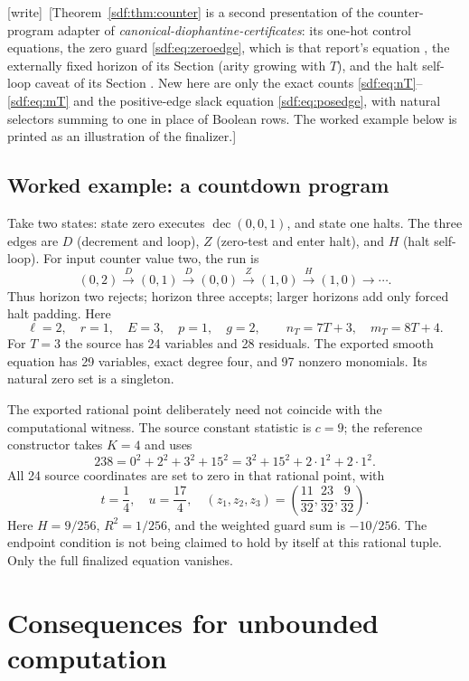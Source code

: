 \documentclass[11pt,a4paper]{article}
\theoremstyle{definition}
\theoremstyle{remark}
\newcommand{\wtag}{\textup{[write]}}
\begin{document}
\wtag\ [Theorem~\ref{sdf:thm:counter} is a second presentation of the
counter-program adapter of \emph{canonical-diophantine-certificates}: its
one-hot control equations, the zero guard \eqref{sdf:eq:zeroedge}, which is
that report's equation , the externally fixed
horizon of its Section  (arity growing with
$T$), and the halt self-loop caveat of its Section
. New here are only the exact counts
\eqref{sdf:eq:nT}--\eqref{sdf:eq:mT} and the positive-edge slack equation
\eqref{sdf:eq:posedge}, with natural selectors summing to one in place of
Boolean rows. The worked example below is printed as an illustration of the
finalizer.]

\subsection{Worked example: a countdown program}

Take two states: state zero executes
$\operatorname{dec}(0,0,1)$, and state one halts. The three edges are
$D$ (decrement and loop), $Z$ (zero-test and enter halt), and $H$ (halt
self-loop). For input counter value two, the run is
\[
 (0,2)\xrightarrow{D}(0,1)\xrightarrow{D}(0,0)
       \xrightarrow{Z}(1,0)\xrightarrow{H}(1,0)\longrightarrow\cdots.
\]
Thus horizon two rejects; horizon three accepts; larger horizons add only
forced halt padding. Here
\[
 \ell=2,\quad r=1,\quad E=3,\quad p=1,\quad g=2,
 \qquad n_T=7T+3,\quad m_T=8T+4.
\]
For $T=3$ the source has 24 variables and 28 residuals. The exported
smooth equation has 29 variables, exact degree four, and 97 nonzero
monomials. Its natural zero set is a singleton.

The exported rational point deliberately need not coincide with the
computational witness. The source constant statistic is $c=9$; the
reference constructor takes $K=4$ and uses
\[
 238=0^2+2^2+3^2+15^2=3^2+15^2+2\cdot1^2+2\cdot1^2.
\]
All 24 source coordinates are set to zero in that rational point, with
\[
 t=\frac14,\quad u=\frac{17}{4},\quad
 (z_1,z_2,z_3)=\left(\frac{11}{32},\frac{23}{32},\frac9{32}\right).
\]
Here $H=9/256$, $R^2=1/256$, and the weighted guard sum is $-10/256$.
The endpoint condition is not being claimed to hold by itself at this
rational tuple. Only the full finalized equation vanishes.

\section{Consequences for unbounded computation}\label{sdf:sec:undecidable}
\end{document}
